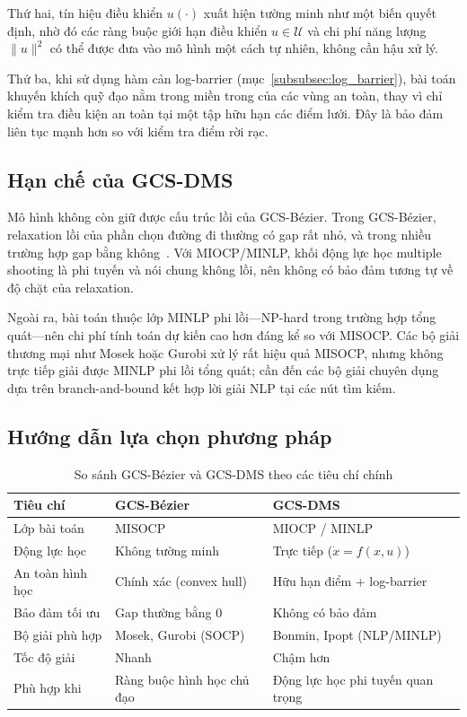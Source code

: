 Thứ hai, tín hiệu điều khiển $u(\cdot)$ xuất hiện tường minh như một biến quyết định, nhờ đó các ràng buộc giới hạn điều khiển $u \in \mathcal{U}$ và chi phí năng lượng $\|u\|^2$ có thể được đưa vào mô hình một cách tự nhiên, không cần hậu xử lý.

Thứ ba, khi sử dụng hàm cản log-barrier (mục~\ref{subsubsec:log_barrier}), bài toán khuyến khích quỹ đạo nằm trong miền trong của các vùng an toàn, thay vì chỉ kiểm tra điều kiện an toàn tại một tập hữu hạn các điểm lưới. Đây là bảo đảm liên tục mạnh hơn so với kiểm tra điểm rời rạc.

\subsection{Hạn chế của GCS-DMS}
\label{subsec:discussion_ocpdms_cons}

Mô hình không còn giữ được cấu trúc lồi của GCS-Bézier. Trong GCS-Bézier, relaxation lồi của phần chọn đường đi thường có gap rất nhỏ, và trong nhiều trường hợp gap bằng không~\cite{MarcucciEtAl2023GCS}. Với MIOCP/MINLP, khối động lực học multiple shooting là phi tuyến và nói chung không lồi, nên không có bảo đảm tương tự về độ chặt của relaxation.

Ngoài ra, bài toán thuộc lớp MINLP phi lồi---NP-hard trong trường hợp tổng quát---nên chi phí tính toán dự kiến cao hơn đáng kể so với MISOCP. Các bộ giải thương mại như Mosek hoặc Gurobi xử lý rất hiệu quả MISOCP, nhưng không trực tiếp giải được MINLP phi lồi tổng quát; cần đến các bộ giải chuyên dụng dựa trên branch-and-bound kết hợp lời giải NLP tại các nút tìm kiếm.

\subsection{Hướng dẫn lựa chọn phương pháp}
\label{subsec:discussion_guidelines}

\begin{table}[htbp]
\centering
\caption{So sánh GCS-Bézier và GCS-DMS theo các tiêu chí chính}
\label{tab:comparison}
\begin{tabular}{lll}
\toprule
\textbf{Tiêu chí} & \textbf{GCS-Bézier} & \textbf{GCS-DMS} \\
\midrule
Lớp bài toán & MISOCP & MIOCP / MINLP \\
Động lực học & Không tường minh & Trực tiếp ($\dot x = f(x,u)$) \\
An toàn hình học & Chính xác (convex hull) & Hữu hạn điểm + log-barrier \\
Bảo đảm tối ưu & Gap thường bằng 0 & Không có bảo đảm \\
Bộ giải phù hợp & Mosek, Gurobi (SOCP) & Bonmin, Ipopt (NLP/MINLP) \\
Tốc độ giải & Nhanh & Chậm hơn \\
Phù hợp khi & Ràng buộc hình học chủ đạo & Động lực học phi tuyến quan trọng \\
\bottomrule
\end{tabular}
\end{table}

